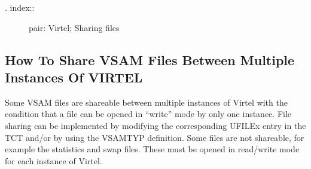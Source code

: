 \documentclass[letterpaper,10pt,english]{sphinxmanual}
\begin{document}
\begin{sphinxVerbatim}[commandchars=\\\{\}]

                             
                                                    
                                                       
                                                       
                                                       
         
                               
                                                    
                                                      
                                                       
                                                      
        
\end{sphinxVerbatim}
\begin{description}
\item[{. index::}] \leavevmode
pair: Virtel; Sharing files

\end{description}


\subsection{How To Share VSAM Files Between Multiple Instances Of VIRTEL}
\label{\detokenize{Installation_Guide:how-to-share-vsam-files-between-multiple-instances-of-virtel}}
Some VSAM files are shareable between multiple instances of Virtel with the condition that a file can be opened in “write” mode by only one instance. File sharing can be implemented by modifying the corresponding UFILEx entry in the TCT and/or by using the VSAMTYP definition. Some files are not shareable, for example the statistics and swap files. These must be opened in read/write mode for each instance of Virtel.
\end{document}

